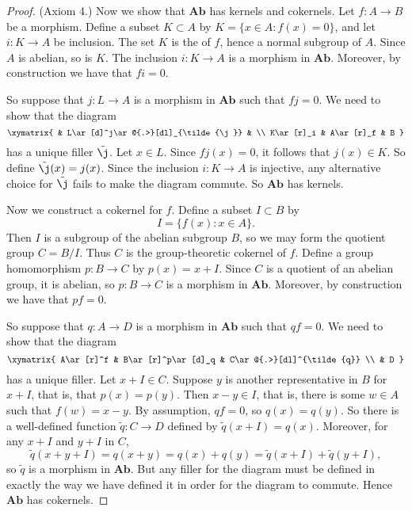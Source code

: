 \documentclass[12pt]{article}
\newcommand{\Ab}{\mathbf{Ab}}
\begin{document}
\begin{proof}
(Axiom 4.)  Now we show that $\Ab$ has kernels and cokernels.  Let $f\colon A\to B$ be a morphism.  Define a subset $K\subset A$ by $K = \{ x\in A\colon f(x) = 0\}$, and let $i\colon K\to A$ be inclusion.  The set $K$ is the  of $f$, hence a normal subgroup of $A$.  Since $A$ is abelian, so is $K$.  The inclusion $i\colon K\to A$ is a morphism in $\Ab$.  Moreover, by construction we have that $fi=0$.  

So suppose that $j\colon L\to A$ is a morphism in $\Ab$ such that $fj=0$.  We need to show that the diagram
\[\xymatrix{
          & L\ar[d]^j\ar@{.>}[dl]_{\tilde{\j}} &   \\
K\ar[r]_i & A\ar[r]_f                              & B
}\]
has a unique filler $\tilde{\j}$.  Let $x\in L$.  Since $fj(x)=0$, it follows that $j(x)\in K$.  So define $\tilde{\j}(x)=j(x)$.  Since the inclusion $i\colon K\to A$ is injective, any alternative choice for $\tilde{\j}$ fails to make the diagram commute.  So $\Ab$ has kernels.

Now we construct a cokernel for $f$.  Define a subset $I\subset B$ by 
\[
I = \{ f(x) \colon x\in A\}.
\]
Then $I$ is a subgroup of the abelian subgroup $B$, so we may form the quotient group $C=B/I$.  Thus $C$ is the group-theoretic cokernel of $f$.  Define a group homomorphism $p\colon B\to C$ by $p(x) = x + I$.  Since $C$ is a quotient of an abelian group, it is abelian, so $p\colon B\to C$ is a morphism in $\Ab$.  Moreover, by construction we have that $pf = 0$.

So suppose that $q\colon A\to D$ is a morphism in $\Ab$ such that $qf=0$.  We need to show that the diagram
\[\xymatrix{
A\ar[r]^f & B\ar[r]^p\ar[d]_q & C\ar@{.>}[dl]^{\tilde{q}} \\
          & D
}\]
has a unique filler.  Let $x+I\in C$.  Suppose $y$ is another representative in $B$ for $x+I$, that is, that $p(x) = p(y)$.  Then $x-y\in I$, that is, there is some $w\in A$ such that $f(w) = x - y$.  By assumption, $qf = 0$, so $q(x) = q(y)$.  So there is a well-defined function $\tilde{q}\colon C\to D$ defined by $\tilde{q}(x+I) = q(x)$.  Moreover, for any $x+I$ and $y+I$ in $C$,
\[
\tilde{q}(x+y+I) = q(x+y) = q(x) + q(y) = \tilde{q}(x+I) +\tilde{q}(y+I),
\]
so $\tilde{q}$ is a morphism in $\Ab$.  But any filler for the diagram must be defined in exactly the way we have defined it in order for the diagram to commute.  Hence $\Ab$ has cokernels.


\end{proof}
\end{document}
